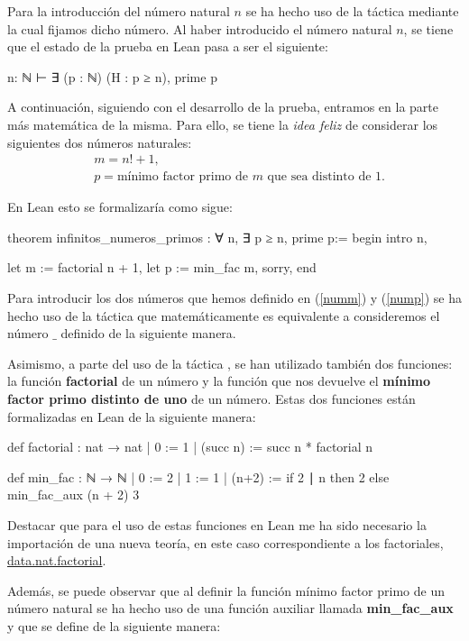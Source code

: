 Para la introducción del número natural \(n\) se ha hecho uso de la
táctica  mediante la cual fijamos dicho número. Al
haber introducido el número natural \(n\), se tiene que el estado de la
prueba en Lean pasa a ser el siguiente:
\begin{leancode}
n: ℕ
⊢ ∃ (p : ℕ) (H : p ≥ n), prime p
\end{leancode}

A continuación, siguiendo con el desarrollo de la prueba, entramos en la
parte más matemática de la misma. Para ello, se tiene la \textit{idea
feliz} de considerar los siguientes dos números naturales:
\begin{align}
  &m = n!+1,\label{numm}\\
  &p = \text{mínimo factor primo de \(m\) que sea distinto de 1}.\label{nump}
\end{align}

En Lean esto se formalizaría como sigue:
\begin{leancode}
theorem infinitos_numeros_primos : ∀ n, ∃ p ≥ n, prime p:=
begin
  intro n,

  let m := factorial n + 1,
  let p := min_fac m,
  sorry,
end
\end{leancode}

Para introducir los dos números que hemos definido en (\ref{numm}) y
(\ref{nump}) se ha hecho uso de la táctica  que
matemáticamente es equivalente a consideremos el número \(\_\) definido
de la siguiente manera.

Asimismo, a parte del uso de la táctica , se han
utilizado también dos funciones: la función \textbf{factorial} de un número y la
función que nos devuelve el \textbf{mínimo factor primo distinto de uno} de un
número. Estas dos funciones están formalizadas en Lean de la siguiente
manera:
\begin{leancode}
def factorial : nat → nat
  | 0        := 1
  | (succ n) := succ n * factorial n

def min_fac : ℕ → ℕ
  | 0 := 2
  | 1 := 1
  | (n+2) := if 2 ∣ n then 2 else min_fac_aux (n + 2) 3
\end{leancode}

Destacar que para el uso de estas funciones en Lean me ha sido necesario
la importación de una nueva teoría, en este caso correspondiente a los
factoriales,
\href{https://github.com/leanprover-community/mathlib/blob/master/src/data/nat/factorial.lean}{data.nat.factorial}.

Además, se puede observar que al definir la función mínimo factor primo
de un número natural se ha hecho uso de una función auxiliar llamada
\textbf{min\_fac\_aux} y que se define de la siguiente manera:


